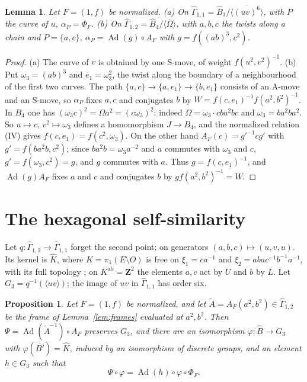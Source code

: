 \documentclass[11pt,a4paper]{article}
\theoremstyle{plain}
\newtheorem{lemma}[theorem]{Lemma}
\newtheorem{proposition}[theorem]{Proposition}
\theoremstyle{definition}
\theoremstyle{remark}
\newcommand{\Z}{\mathbf Z}
\newcommand{\Bh}{\widehat B}
\newcommand{\Gh}{\widehat\Gamma}
\newcommand{\Ad}{\operatorname{Ad}}
\newcommand{\ab}{\mathrm{ab}}
\begin{document}
\begin{lemma}\label{lem:lowgenus}
Let $F=(1,f)$ be normalized.
\textup{(a)} On $\Gh_{1,1}=\Bh_3/\overline{\langle(uv)^6\rangle}$, with $P$ the curve of $u$, $\alpha_P=\Phi_F$.
\textup{(b)} On $\Gh_{1,2}=\Bh_4/\overline{\langle\Omega\rangle}$, with $a,b,c$ the twists along a chain and
$P=\{a,c\}$, $\alpha_P=\Ad(g)\circ A_F$ with $g=f((ab)^3,c^2)$.
\end{lemma}

\begin{proof}
(a) The curve of $v$ is obtained by one S-move, of weight $f(u^2,v^2)^{-1}$. (b) Put $\omega_3=(ab)^3$ and
$e_1=\omega_3^2$, the twist along the boundary of a neighbourhood of the first two curves. The path
$\{a,c\}\to\{a,e_1\}\to\{b,e_1\}$ consists of an A-move and an S-move, so $\alpha_P$ fixes $a,c$ and conjugates $b$
by $W=f(c,e_1)^{-1}f(a^2,b^2)^{-1}$. In $B_4$ one has $(\omega_3c)^2=\Omega a^2=(c\omega_3)^2$: indeed
$\Omega=\omega_3\cdot cba^2bc$ and $\omega_3=ba^2ba^2$. So $u\mapsto c$, $v^2\mapsto\omega_3$ defines a homomorphism
$J\to B_4$, and the normalized relation (IV) gives $f(c,e_1)=f(c^2,\omega_3)$. On the other hand
$A_F(c)=g'^{-1}cg'$ with $g'=f(ba^2b,c^2)$; since $ba^2b=\omega_3a^{-2}$ and $a$ commutes with $\omega_3$ and $c$,
$g'=f(\omega_3,c^2)=g$, and $g$ commutes with $a$. Thus $g=f(c,e_1)^{-1}$, and $\Ad(g)A_F$ fixes $a$ and $c$ and
conjugates $b$ by $gf(a^2,b^2)^{-1}=W$.
\end{proof}

\section{The hexagonal self-similarity}\label{sec:H}

Let $q:\Gh_{1,2}\to\Gh_{1,1}$ forget the second point; on generators $(a,b,c)\mapsto(u,v,u)$. Its kernel is
$\widehat K$, where $K=\pi_1(E\setminus O)$ is free on $\xi_1=ca^{-1}$ and $\xi_2=abac^{-1}b^{-1}a^{-1}$, with its
full topology \cite{A}; on $K^{\ab}=\Z^2$ the elements $a,c$ act by $U$ and $b$ by $L$. Let
$G_3=q^{-1}(\langle uv\rangle)$; the image of $uv$ in $\Gh_{1,1}$ has order six.

\begin{proposition}\label{prop:H}
Let $F=(1,f)$ be normalized, and let $\tilde A=A_F(a^2,b^2)\in\Gh_{1,2}$ be the frame of Lemma~\ref{lem:frames}
evaluated at $a^2,b^2$. Then $\Psi=\Ad(\tilde A^{-1})\circ A_F$ preserves $G_3$, and there are an isomorphism
$\varphi:\Bh\to G_3$ with $\varphi(\overline{B'})=\widehat K$, induced by an isomorphism of discrete groups, and an
element $h\in G_3$ such that
\[
 \Psi\circ\varphi=\Ad(h)\circ\varphi\circ\Phi_F .
\]
\end{proposition}
\end{document}
